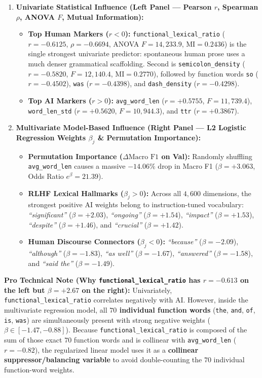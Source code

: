 \documentclass[11pt, a4paper]{article}
\begin{document}
\begin{enumerate}[itemsep=3pt]
    \item \textbf{Univariate Statistical Influence (Left Panel --- Pearson $r$, Spearman $\rho$, ANOVA $F$, Mutual Information):}
    \begin{itemize}[noitemsep]
        \item \textbf{Top Human Markers ($r < 0$):} \texttt{functional\_lexical\_ratio} ($r = -0.6125$, $\rho = -0.6694$, ANOVA $F = 14,233.9$, $\text{MI} = 0.2436$) is the single strongest univariate predictor: spontaneous human prose uses a much denser grammatical scaffolding. Second is \texttt{semicolon\_density} ($r = -0.5820$, $F = 12,140.4$, $\text{MI} = \mathbf{0.2770}$), followed by function words \texttt{so} ($r = -0.4502$), \texttt{was} ($r = -0.4398$), and \texttt{dash\_density} ($r = -0.4298$).
        \item \textbf{Top AI Markers ($r > 0$):} \texttt{avg\_word\_len} ($r = +0.5755$, $F = 11,739.4$), \texttt{word\_len\_std} ($r = +0.5620$, $F = 10,944.3$), and \texttt{ttr} ($r = +0.3867$).
    \end{itemize}
    \item \textbf{Multivariate Model-Based Influence (Right Panel --- L2 Logistic Regression Weights $\beta_j$ \& Permutation Importance):}
    \begin{itemize}[noitemsep]
        \item \textbf{Permutation Importance ($\Delta \text{Macro F1}$ on Val):} Randomly shuffling \texttt{avg\_word\_len} causes a massive $\mathbf{-14.06\%}$ drop in Macro F1 ($\beta = +3.063$, Odds Ratio $e^{\beta} = 21.39$).
        \item \textbf{RLHF Lexical Hallmarks ($\beta_j > 0$):} Across all $4,600$ dimensions, the strongest positive AI weights belong to instruction-tuned vocabulary: \textit{``significant''} ($\beta = +2.03$), \textit{``ongoing''} ($\beta = +1.54$), \textit{``impact''} ($\beta = +1.53$), \textit{``despite''} ($\beta = +1.46$), and \textit{``crucial''} ($\beta = +1.42$).
        \item \textbf{Human Discourse Connectors ($\beta_j < 0$):} \textit{``because''} ($\beta = -2.09$), \textit{``although''} ($\beta = -1.83$), \textit{``as well''} ($\beta = -1.67$), \textit{``answered''} ($\beta = -1.58$), and \textit{``said the''} ($\beta = -1.49$).
    \end{itemize}
\end{enumerate}

\noindent\textbf{Pro Technical Note (Why \texttt{functional\_lexical\_ratio} has $r = -0.613$ on the left but $\beta = +2.67$ on the right):}
Univariately, \texttt{functional\_lexical\_ratio} correlates negatively with AI. However, inside the multivariate regression model, all \textbf{$70$ individual function words} (\texttt{the}, \texttt{and}, \texttt{of}, \texttt{is}, \texttt{was}) are simultaneously present with strong negative weights ($\beta \in [-1.47, -0.88]$). Because \texttt{functional\_lexical\_ratio} is composed of the sum of those exact $70$ function words and is collinear with \texttt{avg\_word\_len} ($r = -0.82$), the regularized linear model uses it as a \textbf{collinear suppressor/balancing variable} to avoid double-counting the $70$ individual function-word weights.
\end{document}
